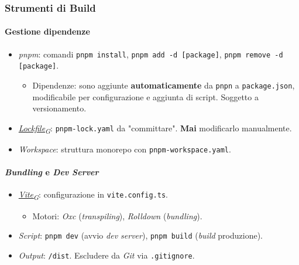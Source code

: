 \documentclass[12pt, a4paper]{article}
\newcommand{\urlglossario}{https://skynetunigroup.github.io/Code_Guardian/Documentazione/PB/glossario_v2.0.0.pdf} %
\newcommand{\glo}[2]{\href{\urlglossario\#nameddest=#2}{#1\textsubscript{G}}}
\begin{document}
\newpage
\subsubsection{Strumenti di Build}
\paragraph{Gestione dipendenze}
\begin{itemize}
    \item \textit{pnpm}: comandi \texttt{pnpm install}, \texttt{pnpm add -d [package]}, \texttt{pnpm remove -d [package]}.
        \begin{itemize}
            \item Dipendenze: sono aggiunte \textbf{automaticamente} da \texttt{pnpn} a \texttt{package.json}, modificabile per configurazione e aggiunta di script. Soggetto a versionamento.
        \end{itemize}
    \item \textit{\glo{Lockfile}{lockfile}}: \texttt{pnpm-lock.yaml} da "committare". \textbf{Mai} modificarlo manualmente.
    \item \textit{Workspace}: struttura monorepo con \texttt{pnpm-workspace.yaml}.
\end{itemize}

\paragraph{\textit{Bundling} e \textit{Dev Server}}
\begin{itemize}
    \item \textit{\glo{Vite}{vite}}: configurazione in \texttt{vite.config.ts}.
    \begin{itemize}
        \item Motori: \textit{Oxc} (\textit{transpiling}), \textit{Rolldown} (\textit{bundling}).
    \end{itemize}
    \item \textit{Script}: \texttt{pnpm dev} (avvio \textit{dev server}), \texttt{pnpm build} (\textit{build} produzione).
    \item \textit{Output}: \texttt{/dist}. Escludere da \textit{Git} via \texttt{.gitignore}.
\end{itemize}
\end{document}
